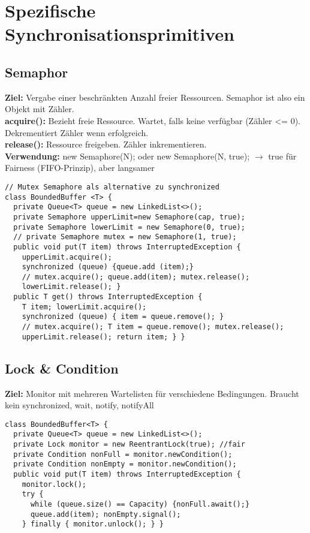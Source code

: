 
\section{Spezifische Synchronisationsprimitiven}
\subsection{Semaphor}
\textbf{Ziel:} Vergabe einer beschränkten Anzahl freier Ressourcen. Semaphor ist also ein Objekt mit Zähler.\\
\textcolor{b}{\textbf{acquire():}} Bezieht freie Ressource. Wartet, falls keine verfügbar (Zähler <= 0). Dekrementiert Zähler wenn erfolgreich.\\
\textcolor{b}{\textbf{release():}} Ressource freigeben. Zähler inkrementieren.\\
\textbf{Verwendung:} \textcolor{b}{new Semaphore(N);} oder \textcolor{b}{new Semaphore(N, true);} $\rightarrow$ true für Fairness (FIFO-Prinzip), aber langsamer
\begin{lstlisting}
// Mutex Semaphore als alternative zu synchronized
class BoundedBuffer <T> {
  private Queue<T> queue = new LinkedList<>();
  private Semaphore upperLimit=new Semaphore(cap, true);
  private Semaphore lowerLimit = new Semaphore(0, true);
  // private Semaphore mutex = new Semaphore(1, true);
  public void put(T item) throws InterruptedException {
    upperLimit.acquire();
    synchronized (queue) {queue.add (item);}
    // mutex.acquire(); queue.add(item); mutex.release();
    lowerLimit.release(); }
  public T get() throws InterruptedException {
    T item; lowerLimit.acquire();
    synchronized (queue) { item = queue.remove(); }
    // mutex.acquire(); T item = queue.remove(); mutex.release();
    upperLimit.release(); return item; } }
\end{lstlisting}
\subsection{Lock \& Condition}
\textcolor{b}{\textbf{Ziel:}} Monitor mit mehreren Wartelisten für verschiedene Bedingungen. Braucht kein \textcolor{b}{synchronized, wait, notify, notifyAll}
\begin{lstlisting}
class BoundedBuffer<T> {
  private Queue<T> queue = new LinkedList<>();
  private Lock monitor = new ReentrantLock(true); //fair
  private Condition nonFull = monitor.newCondition();
  private Condition nonEmpty = monitor.newCondition();
  public void put(T item) throws InterruptedException {
    monitor.lock();
    try {
      while (queue.size() == Capacity) {nonFull.await();}
      queue.add(item); nonEmpty.signal();
    } finally { monitor.unlock(); } }
\end{lstlisting}
